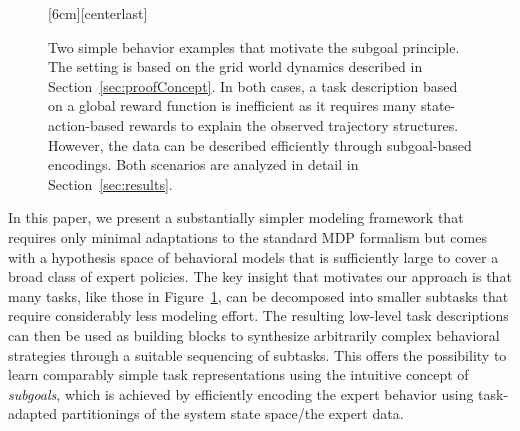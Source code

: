 \documentclass[twoside,11pt]{article}
\begin{document}
\begin{figure}
	\centering
%
	\captionsetup{justification=centerlast}%
	[6cm][centerlast]{%
	}
	\hspace{5ex}
	\caption{Two simple behavior examples that motivate the subgoal principle. The setting is based on the grid world dynamics described in Section~\ref{sec:proofConcept}. In both cases, a task description based on a global reward function is inefficient as it requires %
		many state-action-based rewards to explain the observed trajectory structures. However, the data can be described efficiently through subgoal-based encodings. Both scenarios are analyzed in detail in Section~\ref{sec:results}.}
	\label{fig:JMLR:motivationFigures}
\end{figure}

%
%
%
%
%
%
%
%
%
%
%
%
%
%
%
%
%

In this paper, we present a substantially simpler modeling framework that requires only minimal adaptations to the standard MDP formalism but comes with a hypothesis space of behavioral models that is sufficiently large to cover a broad class of expert policies. The key insight that motivates our approach is that many tasks, like those in Figure~\ref{fig:JMLR:motivationFigures}, can be decomposed into smaller subtasks that require considerably less modeling effort. The resulting low-level task descriptions can then be used as building blocks to synthesize arbitrarily complex behavioral strategies through a suitable sequencing of subtasks. This %
offers the possibility to learn comparably simple task representations %
using the intuitive concept of \textit{subgoals}, which is achieved by efficiently encoding the expert behavior %
using task-adapted partitionings of the system state space/the expert data.
\end{document}

